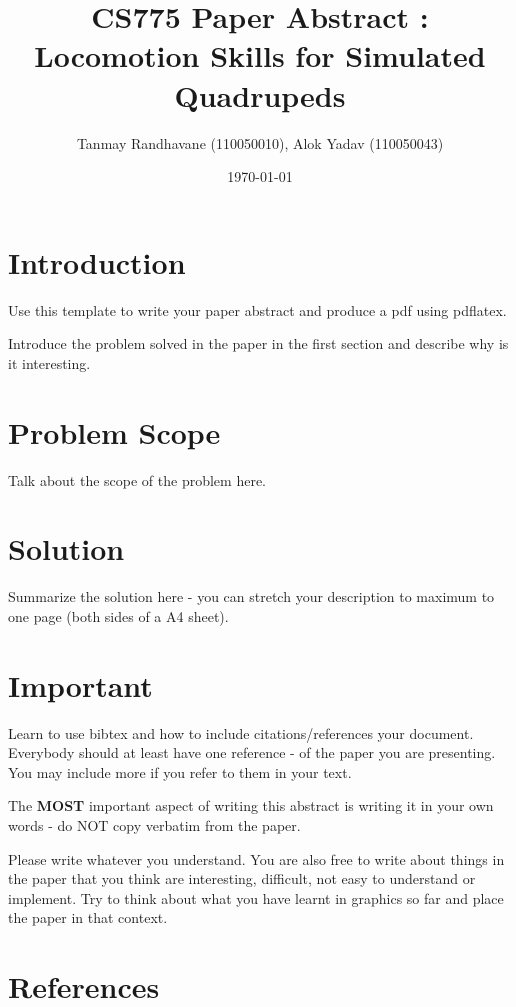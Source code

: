 \documentclass[a4paper,11pt,twocolumn]{article}
\title{CS775 Paper Abstract : Locomotion Skills for Simulated Quadrupeds}
\author{Tanmay Randhavane (110050010), Alok Yadav (110050043)}
\date{\today}
\begin{document}
\maketitle

\section{Introduction}
Use this template to write your paper abstract and produce a pdf using
pdflatex.

Introduce the problem solved in the paper in the first section and
describe why is it interesting.

\section{Problem Scope}
Talk about the scope of the problem here.

\section{Solution}
Summarize the solution here - you can stretch your description to
maximum to one page (both sides of a A4 sheet).

\section{Important}
Learn to use bibtex and how to include citations/references your
document. Everybody should at least have one reference - of the paper
you are presenting. You may include more if you refer to them in your
text.

The \textbf{MOST} important aspect of writing this abstract is writing
it in your own words - do NOT copy verbatim from the paper. 

Please write whatever you understand. You are also free to write about
things in the paper that you think are interesting, difficult, not
easy to understand or implement. Try to think about what you have
learnt in graphics so far and place the paper in that context. ~\cite{2011-TOG-quadruped}

\section{References}

 
\end{document}
